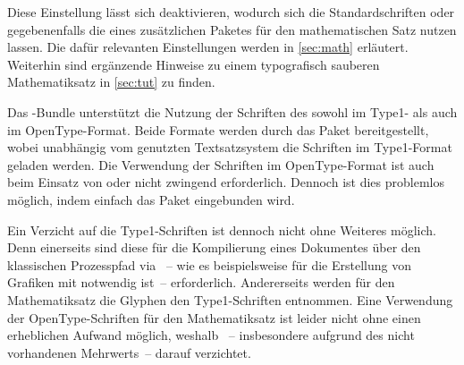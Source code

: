 \begin{DeclareEntity*}{}
\begin{DeclareEntity*}{}
\begin{DeclareEntity*}{}
Diese Einstellung lässt sich deaktivieren, wodurch sich die Standardschriften 
oder gegebenenfalls die eines zusätzlichen Paketes für den mathematischen Satz 
nutzen lassen. Die dafür relevanten Einstellungen werden in \autoref{sec:math} 
erläutert. Weiterhin sind ergänzende Hinweise zu einem typografisch sauberen
Mathematiksatz in \autoref{sec:tut} zu finden.


Das \TUDScript-Bundle unterstützt die Nutzung der Schriften des \CDs sowohl 
im Type1- als auch im OpenType-Format. Beide Formate werden durch das Paket 
 bereitgestellt, wobei unabhängig vom genutzten 
Textsatzsystem die Schriften im Type1-Format geladen werden. Die Verwendung der 
Schriften im OpenType-Format ist auch beim Einsatz von  oder 
 nicht zwingend erforderlich. Dennoch ist dies problemlos 
möglich, indem einfach das Paket  eingebunden wird.

Ein Verzicht auf die Type1-Schriften ist dennoch nicht ohne Weiteres möglich. 
Denn einerseits sind diese für die Kompilierung eines Dokumentes über den 
klassischen Prozesspfad via ~-- wie es 
beispielsweise für die Erstellung von Grafiken mit  notwendig 
ist~-- erforderlich. Andererseits werden für den Mathematiksatz die Glyphen den 
Type1-Schriften entnommen. Eine Verwendung der OpenType-Schriften für den 
Mathematiksatz ist leider nicht ohne einen erheblichen Aufwand möglich, weshalb 
\TUDScript~-- insbesondere aufgrund des nicht vorhandenen Mehrwerts~-- darauf 
verzichtet.%
%




\end{DeclareEntity*}
\end{DeclareEntity*}
\end{DeclareEntity*}
